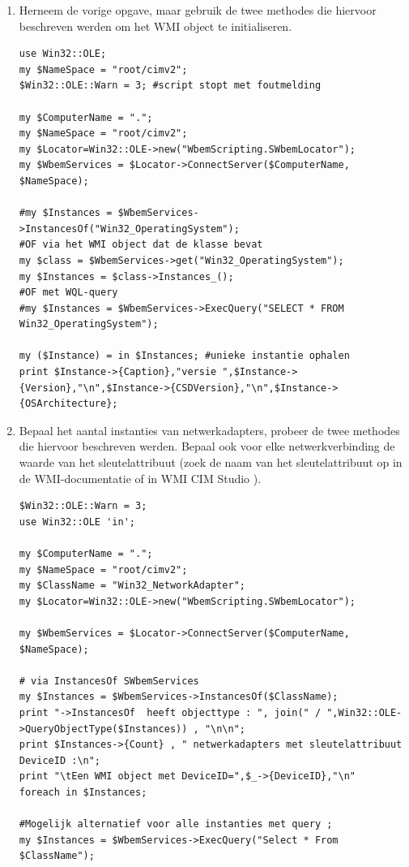 \documentclass[11pt,a4paper]{report}
\begin{document}
\begin{enumerate}[resume]
	\item Herneem de vorige opgave, maar gebruik de twee methodes die hiervoor beschreven werden om het WMI object te initialiseren.
	\begin{lstlisting}
use Win32::OLE;
my $NameSpace = "root/cimv2";
$Win32::OLE::Warn = 3; #script stopt met foutmelding

my $ComputerName = ".";
my $NameSpace = "root/cimv2";
my $Locator=Win32::OLE->new("WbemScripting.SWbemLocator");
my $WbemServices = $Locator->ConnectServer($ComputerName, $NameSpace);

#my $Instances = $WbemServices->InstancesOf("Win32_OperatingSystem");
#OF via het WMI object dat de klasse bevat
my $class = $WbemServices->get("Win32_OperatingSystem");
my $Instances = $class->Instances_();
#OF met WQL-query
#my $Instances = $WbemServices->ExecQuery("SELECT * FROM Win32_OperatingSystem");

my ($Instance) = in $Instances; #unieke instantie ophalen
print $Instance->{Caption},"versie ",$Instance->{Version},"\n",$Instance->{CSDVersion},"\n",$Instance->{OSArchitecture};
	\end{lstlisting}
	\item Bepaal het aantal instanties van netwerkadapters, probeer de twee methodes die hiervoor beschreven werden.
	Bepaal ook voor elke netwerkverbinding de waarde van het sleutelattribuut (zoek de naam van het sleutelattribuut op in de WMI-documentatie of in WMI CIM Studio ).
	\begin{lstlisting}
$Win32::OLE::Warn = 3;
use Win32::OLE 'in';

my $ComputerName = ".";
my $NameSpace = "root/cimv2";
my $ClassName = "Win32_NetworkAdapter";
my $Locator=Win32::OLE->new("WbemScripting.SWbemLocator");

my $WbemServices = $Locator->ConnectServer($ComputerName, $NameSpace);

# via InstancesOf SWbemServices
my $Instances = $WbemServices->InstancesOf($ClassName);
print "->InstancesOf  heeft objecttype : ", join(" / ",Win32::OLE->QueryObjectType($Instances)) , "\n\n";
print $Instances->{Count} , " netwerkadapters met sleutelattribuut DeviceID :\n";
print "\tEen WMI object met DeviceID=",$_->{DeviceID},"\n"
foreach in $Instances;

#Mogelijk alternatief voor alle instanties met query ;
my $Instances = $WbemServices->ExecQuery("Select * From $ClassName");



\end{lstlisting}
\end{enumerate}
\end{document}
